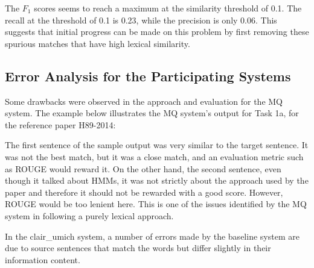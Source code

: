 \documentclass[11pt]{article}
\begin{document}
The $F_1$ scores seems to reach a maximum at the similarity threshold of 0.1. The recall at the threshold of 0.1 is 0.23, while the precision is only 0.06. This suggests that initial progress can be made on this problem by first removing these spurious matches that have high lexical similarity.
\subsection{Error Analysis for the Participating Systems}

Some drawbacks were observed in the approach and evaluation for the MQ system. The example below illustrates the MQ system's output for Task 1a, for the reference paper H89-2014:

\noindent{}
The first sentence of the sample output was very similar to the target sentence. It was not the best match, but it was a close match, and an evaluation metric such as ROUGE would reward it. On the other hand, the second sentence, even though it talked about HMMs, it was not strictly about the approach used by the paper and therefore it should not be rewarded with a good score. However, ROUGE would be too lenient here. This is one of the issues identified by the MQ system in following a purely lexical approach.

In the clair\_umich system, a number of errors made by the baseline system are due to source sentences that match the words but differ slightly in their information content. 
\end{document}
